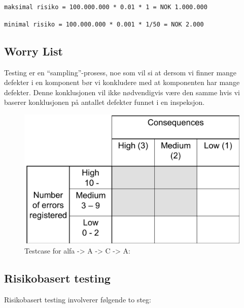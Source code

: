 \texttt{maksimal risiko = 100.000.000 * 0.01 * 1 = NOK 1.000.000}

\texttt{minimal risiko = 100.000.000 * 0.001 * 1/50 = NOK 2.000}

\subsection{Worry List}

Testing er en ``sampling''-prosess, noe som vil si at dersom vi finner
mange defekter i en komponent bør vi konkludere med at komponenten har
mange defekter. Denne konklusjonen vil ikke nødvendigvis være den samme
hvis vi baserer konklusjonen på antallet defekter funnet i en
inspeksjon.

\begin{figure}[htbp]
\centering
\includegraphics{Forelesning 08/img/1.png}
\caption{Testcase for alfa -\textgreater{} A -\textgreater{} C
-\textgreater{} A:}
\end{figure}

\subsection{Risikobasert testing}

Risikobasert testing involverer følgende to steg:

